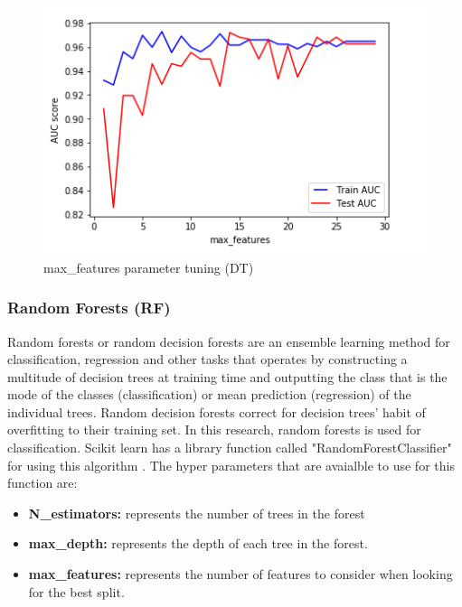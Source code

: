 \documentclass[journal]{IEEEtran}
\begin{document}
\begin{figure}[H]
	\centering
	\includegraphics[width=\linewidth]{maxFeatures_DT.png}
	\caption{max\_features parameter tuning (DT)}
	\label{Fig:dt3}
\end{figure}



 \subsubsection{Random Forests (RF)}
 
Random forests or random decision forests are an ensemble learning method for classification, regression and other tasks that operates by constructing a multitude of decision trees at training time and outputting the class that is the mode of the classes (classification) or mean prediction (regression) of the individual trees. Random decision forests correct for decision trees' habit of overfitting to their training set. In this research, random forests is used for classification. Scikit learn has a library function called "RandomForestClassifier" for using this algorithm \cite{rforest}. The hyper parameters that are avaialble to use for this function are:

\begin{itemize}
  \item \textbf{N\_estimators:} represents the number of trees in the forest
  \item \textbf{max\_depth:}  represents the depth of each tree in the forest.
  \item \textbf{max\_features:} represents the number of features to consider when looking for the best split.\\
\end{itemize}
\end{document}
